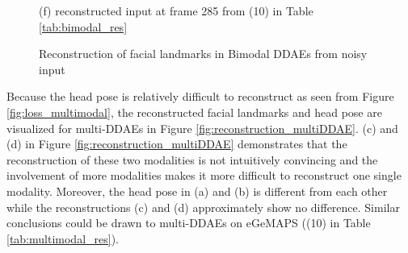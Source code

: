 \begin{figure}[htb]
\begin{minipage}[c]{0.42\linewidth}
    (f) reconstructed input at frame 285 from (10) in Table \ref{tab:bimodal_res}
    \end{minipage}
    \caption{Reconstruction of facial landmarks in Bimodal DDAEs from noisy input}
    \label{fig:reconstruction_biDDAE}
\end{figure}

Because the head pose is relatively difficult to reconstruct as seen from Figure \ref{fig:loss_multimodal}, the reconstructed facial landmarks and head pose are visualized for multi-DDAEs in Figure \ref{fig:reconstruction_multiDDAE}. (c) and (d) in Figure \ref{fig:reconstruction_multiDDAE} demonstrates that the reconstruction of these two modalities is not intuitively convincing and the involvement of more modalities makes it more difficult to reconstruct one single modality. Moreover, the head pose in (a) and (b) is different from each other while the reconstructions (c) and (d) approximately show no difference. Similar conclusions could be drawn to multi-DDAEs on eGeMAPS ((10) in Table \ref{tab:multimodal_res}). 


